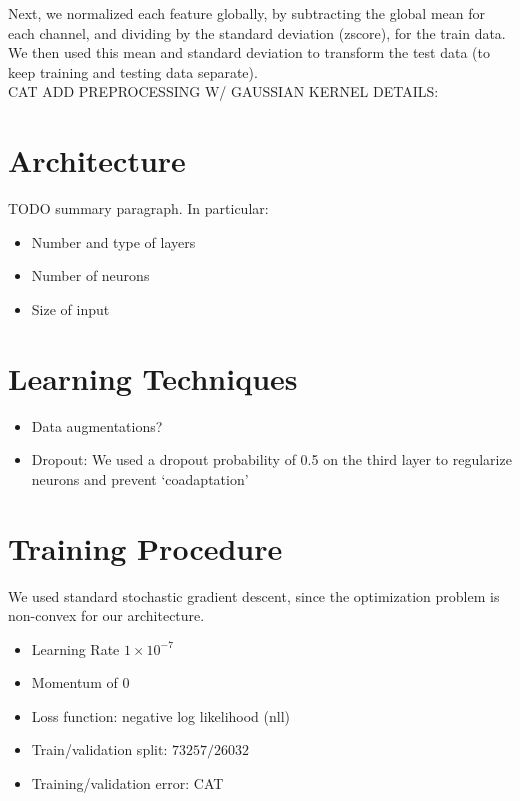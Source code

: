 \documentclass{article}
\begin{document}
Next, we normalized each feature globally, by subtracting the global mean for
each channel, and dividing by the standard deviation (zscore), for the train
data. We then used this mean and standard deviation to transform the test data
(to keep training and testing data separate). \\

CAT ADD PREPROCESSING W/ GAUSSIAN KERNEL DETAILS:\\

\section{Architecture}

TODO summary paragraph. In particular:
\begin{itemize}
\item Number and type of layers
\item Number of neurons
\item Size of input
\end{itemize}

\section{Learning Techniques}
\begin{itemize}
\item Data augmentations?
\item Dropout: We used a dropout probability of 0.5 on the third layer to
regularize neurons and prevent `coadaptation'
\cite{hinton_improving_2012}
\end{itemize}

\section{Training Procedure}
We used standard stochastic gradient descent, since the optimization problem is
non-convex for our architecture. 
\begin{itemize}
\item Learning Rate $1 \times 10^{-7}$
\item Momentum of $0$
\item Loss function: negative log likelihood (nll)
\item Train/validation split: $73257/26032$
\item Training/validation error: CAT
\end{itemize}



\end{document}
